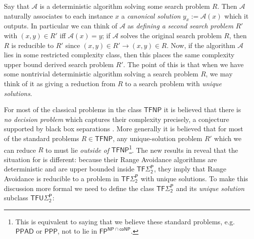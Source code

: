 Say that $\mathcal{A}$ is a deterministic algorithm solving some search problem $R$. Then $\mathcal{A}$ naturally associates to each instance $x$ a \emph{canonical solution} $y_x:= \mathcal{A}(x)$ which it outputs. In particular we can think of $\mathcal{A}$ as \emph{defining a second search problem} $R'$ with $(x,y) \in R'$ iff $\mathcal{A}(x)=y$; if $\mathcal{A}$ solves the original search problem $R$, then $R$ is reducible to $R'$ since $(x,y)\in R' \rightarrow (x,y)\in R$. Now, if the algorithm $\mathcal{A}$ lies in some restricted complexity class, then this places the same complexity upper bound derived search problem $R'$. The point of this is that when we have some nontrivial deterministic algorithm solving a search problem $R$, we may think of it as giving a reduction from $R$ to a search problem with \emph{unique solutions}.

For most of the classical problems in the class $\mathsf{TFNP}$ it is believed that there is \emph{no decision problem} which captures their complexity precisely, a conjecture supported by black box separations \cite{TFNP-separations}. More generally it is believed that for most of the standard problems $R \in \mathsf{TFNP}$, any unique-solution problem $R'$ which we can reduce $R$ to must lie \emph{outside of} $\mathsf{TFNP}$\footnote{This is equivalent to saying that we believe these standard problems, e.g. $\mathsf{PPAD}$ or $\mathsf{PPP}$, not to lie in $\mathsf{FP^{NP \cap coNP}}$.}. The new results in \cite{Li,CHR} reveal that the situation for \avoid is different: because their Range Avoidance algorithms are deterministic and are upper bounded inside $\mathsf{TF\Sigma_2^P}$, they imply that Range Avoidance is reducible to a problem in $\mathsf{TF\Sigma_2^P}$ with unique solutions. To make this discussion more formal we need to define the class $\mathsf{TF\Sigma_2^P}$ and its \emph{unique solution} subclass $\mathsf{TFU\Sigma_2^P}$:

